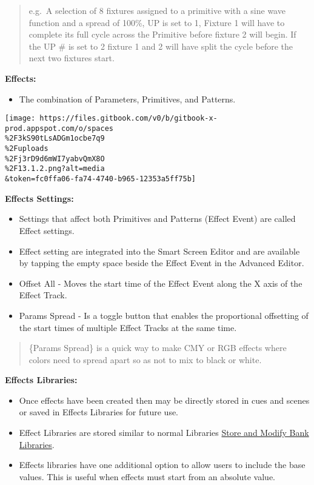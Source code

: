 \documentclass[
]{article}
\providecommand{\tightlist}{%
  \setlength{\itemsep}{0pt}\setlength{\parskip}{0pt}}
\begin{document}
\begin{quote}
e.g.~A selection of 8 fixtures assigned to a primitive with a sine wave function and a spread of 100\%, UP is set to 1, Fixture 1 will have to complete its full cycle across the Primitive before fixture 2 will begin. If the UP \# is set to 2 fixture 1 and 2 will have split the cycle before the next two fixtures start.
\end{quote}

\textbf{Effects:}

\begin{itemize}
\tightlist
\item
  The combination of Parameters, Primitives, and Patterns.
\end{itemize}

\texttt{[image: https://files.gitbook.com/v0/b/gitbook-x-prod.appspot.com/o/spaces\\\%2F3kS90tLsADGm1ocbe7q9\\\%2Fuploads\\\%2Fj3rD9d6mWI7yabvQmX8O\\\%2F13.1.2.png?alt=media\\\&token=fc0ffa06-fa74-4740-b965-12353a5ff75b]}

\textbf{Effects Settings:}

\begin{itemize}
\item
  Settings that affect both Primitives and Patterns (Effect Event) are called Effect settings.
\item
  Effect setting are integrated into the Smart Screen Editor and are available by tapping the empty space beside the Effect Event in the Advanced Editor.
\item
  Offset All - Moves the start time of the Effect Event along the X axis of the Effect Track.
\item
  Params Spread - Is a toggle button that enables the proportional offsetting of the start times of multiple Effect Tracks at the same time.
\end{itemize}

\begin{quote}
\{Params Spread\} is a quick way to make CMY or RGB effects where colors need to spread apart so as not to mix to black or white.
\end{quote}

\textbf{Effects Libraries:}

\begin{itemize}
\item
  Once effects have been created then may be directly stored in cues and scenes or saved in Effects Libraries for future use.
\item
  Effect Libraries are stored similar to normal Libraries \href{https://vibemanual.compulite.com/libraries.html\#store-and-modify-bank-libraries}{Store and Modify Bank Libraries}.
\item
  Effects libraries have one additional option to allow users to include the base values. This is useful when effects must start from an absolute value.
\end{itemize}
\end{document}
